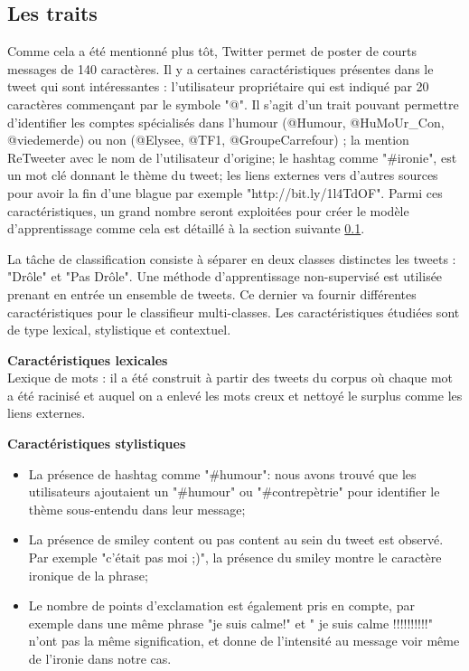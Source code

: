 \documentclass[10pt,a4paper,twoside]{article}
\begin{document}
\subsection{Les traits}
\label{features}
Comme cela a été mentionné plus tôt, Twitter permet de poster de courts messages de 140 caractères. Il y a certaines caractéristiques présentes dans le tweet qui sont intéressantes : l'utilisateur propriétaire qui est indiqué par 20 caractères commençant par le symbole "@". Il s'agit d'un trait pouvant permettre d'identifier les comptes spécialisés dans l'humour (@Humour, @HuMoUr\_Con, @viedemerde) ou non (@Elysee, @TF1, @GroupeCarrefour) ; la mention ReTweeter avec le nom de l'utilisateur d'origine; le hashtag comme "\#ironie", est un mot clé donnant le thème du tweet; les liens externes vers d'autres sources pour avoir la fin d'une blague par exemple "http://bit.ly/1l4TdOF". Parmi ces caractéristiques, un grand nombre seront exploitées pour créer le modèle d'apprentissage comme cela est détaillé à la section suivante \ref{features}.


La tâche de classification consiste à séparer en deux classes distinctes les tweets : "Drôle" et "Pas Drôle".
Une méthode d'apprentissage non-supervisé est utilisée prenant en entrée un ensemble de tweets. Ce dernier va fournir différentes caractéristiques pour le classifieur multi-classes. Les caractéristiques étudiées sont de type lexical, stylistique et contextuel. 

\textbf{Caractéristiques lexicales}\\
Lexique de mots : il a été construit à partir des tweets du corpus où chaque mot a été racinisé et auquel on a enlevé les mots creux et nettoyé le surplus comme les liens externes.
\vspace{0.5cm}

\textbf{Caractéristiques stylistiques}
\begin{itemize}
\item La présence de hashtag comme "\#humour": nous avons trouvé que les utilisateurs ajoutaient un "\#humour" ou "\#contrepètrie" pour identifier le thème sous-entendu dans leur message;
\item La présence de smiley content ou pas content au sein du tweet est observé. Par exemple "c'était pas moi ;)", la présence du smiley montre le caractère ironique de la phrase;
\item Le nombre de points d'exclamation est également pris en compte, par exemple dans une même phrase "je suis calme!" et " je suis calme !!!!!!!!!!" n'ont pas la même signification, et donne de l'intensité au message voir même de l'ironie dans notre cas. 
\end{itemize}
\vspace{1.7cm}
\end{document}

